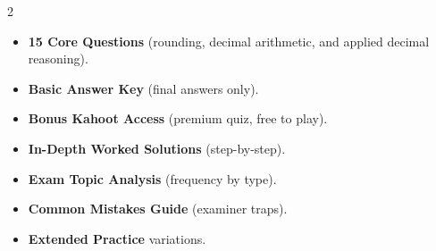 \documentclass[11pt,a4paper]{article}
\newcommand{\FullReleaseDate}{April 30, 2026}
\begin{document}
\vspace{8pt}

\begin{multicols}{2}
  \begin{tcolorbox}[card, title=\sffamily\bfseries\textcolor{white}{\faHandPointDown\ TODAY (Simplified Version)}, colbacktitle=mainblue, boxed title style={sharp corners, boxrule=0pt}]
    \begin{itemize}[leftmargin=1.2em, itemsep=2pt]
      \item \small \textbf{15 Core Questions} (rounding, decimal arithmetic, and applied decimal reasoning).
      \item \small \textbf{Basic Answer Key} (final answers only).
      \item \small \textbf{Bonus Kahoot Access} (premium quiz, free to play).
    \end{itemize}
  \end{tcolorbox}

  \columnbreak

  \begin{tcolorbox}[card, title=\sffamily\bfseries\textcolor{white}{\faRocket\ ON \FullReleaseDate\ (Full Upgrade)}, colbacktitle=mainblue, boxed title style={sharp corners, boxrule=0pt}]
    \begin{itemize}[leftmargin=1.2em, itemsep=2pt]
      \item \small \textbf{In-Depth Worked Solutions} (step-by-step).
      \item \small \textbf{Exam Topic Analysis} (frequency by type).
      \item \small \textbf{Common Mistakes Guide} (examiner traps).
      \item \small \textbf{Extended Practice} variations.
    \end{itemize}
  \end{tcolorbox}
\end{multicols}
\end{document}
